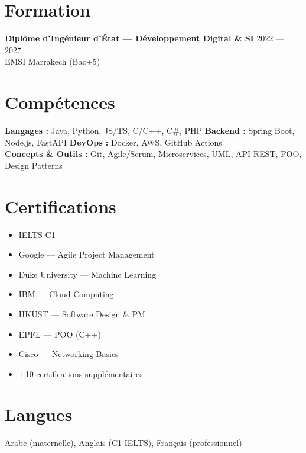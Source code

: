\documentclass[10.5pt,a4paper]{article}
\begin{document}
\section{Formation}
\textbf{Diplôme d'Ingénieur d'État — Développement Digital \& SI} \hfill {\color{muted}\small 2022 — 2027}\\
{\color{teal}EMSI Marrakech (Bac+5)}

\section{Compétences}
\small
\textbf{Langages :} Java, Python, JS/TS, C/C++, C\#, PHP \textbar{}
\textbf{Backend :} Spring Boot, Node.js, FastAPI \textbar{}
\textbf{DevOps :} Docker, AWS, GitHub Actions\\
\textbf{Concepts \& Outils :} Git, Agile/Scrum, Microservices, UML, API REST, POO, Design Patterns

\section{Certifications}
\small
\begin{itemize}[leftmargin=10pt, nosep, topsep=0pt]
  \item IELTS C1
  \item Google — Agile Project Management
  \item Duke University — Machine Learning
  \item IBM — Cloud Computing
  \item HKUST — Software Design \& PM
  \item EPFL — POO (C++)
  \item Cisco — Networking Basics
  \item +10 certifications supplémentaires
\end{itemize}

\section{Langues}
\small Arabe (maternelle), Anglais (C1 IELTS), Français (professionnel)
\end{document}
